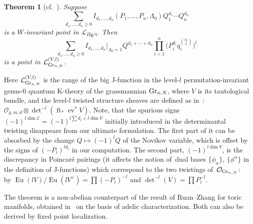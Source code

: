 \documentclass[10pt,a4paper]{amsart}
\numberwithin{equation}{section}
\newtheorem{Theorem}{Theorem}[section]
\def\E{\mathcal E}
\def\L{\mathcal L}
\def\O{\mathcal O}
\def\det{\operatorname{det}}
\def\a{\alpha}
\def\ev{\operatorname{ev}}
\def\ft{\operatorname{ft}}
\def\Eu{\operatorname{Eu}}
\theoremstyle{definition}
\theoremstyle{plain}
\begin{document}
\begin{Theorem}[{cf.~\cite{R-Z}}]\label{thm6}
Suppose
\[
\sum_{d_1,\dots,d_n\geq 0}I_{d_1,\dots,d_n}(P_1,\dots,P_n,\Lambda_0) Q_1^{d_1}\cdots Q_n^{d_n}
\]
is a $W$-invariant point in $\L_{\Pi \mathfrak{g}/\mathfrak{t}}$. Then
\[
\sum_{d_1,\dots,d_n\geq 0}I_{d_1,\dots,d_n}|_{\Lambda_0=1}Q^{d_1+\cdots+d_n} \prod_{i=1}^n \Big( P_i^{d_i}q_i^{\binom{d_i}{2}} \Big)^l
\]
is a point in $\L_{{\rm Gr}_{n,N}}^{(V,l)}$.
\end{Theorem}
Here $\L_{{\rm Gr}_{n,N}}^{(V,l)}$ is the range of the big J-function in the level-$l$ permutation-invariant \mbox{genus-0} quantum K-theory of the grassmannian ${\rm Gr}_{n,N}$, where $V$ is its tautological bundle, and the \mbox{level-$l$} twisted structure sheaves are defined as in~\cite{R-Z}: $\O_{g,m,d}\otimes \det^{-l}(\ft_*\ev^*V)$. Note, that the spurious signs $(-1)^{l\dim \E}=(-1)^{l\sum d_i+l\dim V}$ initially introduced in the determinantal twisting disappears from our ultimate formulation. The first part of it can be absorbed by the change $Q\mapsto (-1)^lQ$ of the Novikov variable, which is offset by the signs of $(-P_i)^{ld_i}$ in our computation. The second part, $(-1)^{l\dim V}$, is the discrepancy in Poincar{\'e} pairings (it affects the notion of~dual bases $\{ \phi_{\a}\}$, $\{ \phi^\a \}$ in the definition of J-functions) which correspond to the two twistings of~$\O_{{\rm Gr}_{n,N}}$: by $\Eu(lV)/\Eu(lV^{\vee})=\prod (-P_i)^{-l}$ and $\det^{-l}(V)=\prod P_i^{-l}$.

The theorem is a non-abelian counterpart of the result of Ruan--Zhang for toric manifolds, obtained in~\cite{R-Z} on the basis of adelic characterization. Both can also be derived by fixed point localization.
\end{document}
